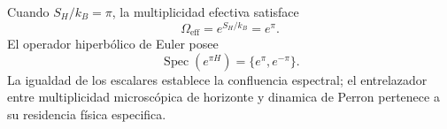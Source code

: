 Cuando \(S_H/k_B=\pi\), la multiplicidad efectiva satisface
\begin{equation}
 \Omega_{\mathrm{eff}}=e^{S_H/k_B}=e^\pi.
 \label{eq:l9s102:omega-e-pi}
\end{equation}
El operador hiperbólico de Euler posee
\begin{equation}
 \operatorname{Spec}(e^{\pi H})=\{e^\pi,e^{-\pi}\}.
 \label{eq:l9s102:e-pi-spectrum}
\end{equation}
La igualdad de los escalares establece la confluencia espectral; el
entrelazador entre multiplicidad microscópica de horizonte y dinamica de
Perron pertenece a su residencia física especifica.
